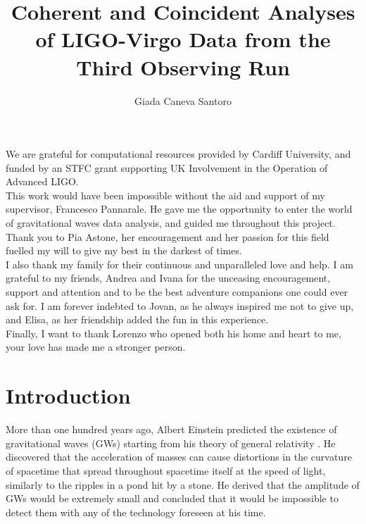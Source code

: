\documentclass[binding=0.6cm, LaM]{sapthesis}
\title{Coherent and Coincident Analyses of LIGO-Virgo Data from the Third Observing Run}
\author{Giada Caneva Santoro}
\begin{document}
\frontmatter
\maketitle
\dedication{Se non tengo presente l’universo, perdo il senso delle proporzioni. \\ Italo Calvino.}


\tableofcontents

\begin{acknowledgments}
We are grateful for computational resources provided by Cardiff University, and funded by an STFC grant supporting UK Involvement in the Operation of Advanced LIGO. \\
This work would have been impossible without the aid and support of my supervisor, Francesco Pannarale. 
He gave me the opportunity to enter the world of gravitational waves data analysis, and guided me throughout this project.\\
Thank you to Pia Astone, her encouragement and her passion for this field fuelled my will to give my best in the darkest of times. \\
I also thank my family for their continuous and unparalleled love and help.
I am grateful to my friends, Andrea and Ivana for the unceasing encouragement, support and attention and to be the best adventure companions one could ever ask for.
 I am forever indebted to Jovan, as he always inspired me not to give up, and Elisa, as her friendship added the fun in this experience.\\
Finally, I want to thank Lorenzo who opened both his home and heart to me, your love has made me a stronger person.
\end{acknowledgments}

\mainmatter 

\chapter*{Introduction}
\label{sec:intro}
	More than one hundred years ago, Albert Einstein predicted the existence of gravitational waves (GWs) 
	starting from his theory of general relativity \cite{1,2}.
	He discovered that the acceleration of masses
	can cause distortions in the curvature of spacetime that 
        spread throughout spacetime itself at the speed of light, 
	similarly to the ripples in a pond hit by a stone.
	He derived that the amplitude of GWs would be extremely small and concluded that 
	it would be impossible to detect them with any of the technology foreseen at his time.
\end{document}
